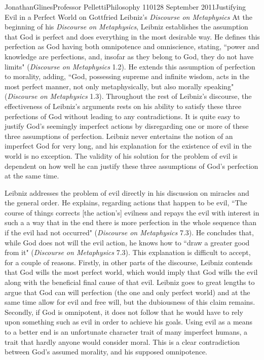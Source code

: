 \documentclass[12pt,letterpaper]{article}
\begin{document}
\begin{mla}{Jonathan}{Glines}{Professor Pelletti}{Philosophy 1101}{28 September 2011}{Justifying Evil in a Perfect World on Gottfried Leibniz's \textit{Discourse on Metaphysics}}
At the beginning of his \textit{Discourse on Metaphysics}, Leibniz establishes the assumption that God is perfect and does everything in the most desirable way. He defines this perfection as God having both omnipotence and omniscience, stating, ``power and knowledge are perfections, and, insofar as they belong to God, they do not have limits" (\textit{Discourse on Metaphysics} 1.2). He extends this assumption of perfection to morality, adding, ``God, possessing supreme and infinite wisdom, acts in the most perfect manner, not only metaphysically, but also morally speaking" (\textit{Discourse on Metaphysics} 1.3). Throughout the rest of Leibniz's discourse, the effectiveness of Leibniz's arguments rests on his ability to satisfy these three perfections of God without leading to any contradictions. It is quite easy to justify God's seemingly imperfect actions by disregarding one or more of these three assumptions of perfection. Leibniz never entertains the notion of an imperfect God for very long, and his explanation for the existence of evil in the world is no exception. The validity of his solution for the problem of evil is dependent on how well he can justify these three assumptions of God's perfection at the same time.

Leibniz addresses the problem of evil directly in his discussion on miracles and the general order. He explains, regarding actions that happen to be evil, ``The course of things corrects [the action's] evilness and repays the evil with interest in such a a way that in the end there is more perfection in the whole sequence than if the evil had not occurred" (\textit{Discourse on Metaphysics} 7.3). He concludes that, while God does not will the evil action, he knows how to ``draw a greater good from it" (\textit{Discourse on Metaphysics} 7.3). This explanation is difficult to accept, for a couple of reasons. Firstly, in other parts of the discourse, Leibniz contends that God wills the most perfect world, which would imply that God wills the evil along with the beneficial final cause of that evil. Leibniz goes to great lengths to argue that God can will perfection (the one and only perfect world) and at the same time allow for evil and free will, but the dubiousness of this claim remains. Secondly, if God is omnipotent, it does not follow that he would have to rely upon something such as evil in order to achieve his goals. Using evil as a means to a better end is an unfortunate character trait of many imperfect humans, a trait that hardly anyone would consider moral. This is a clear contradiction between God's assumed morality, and his supposed omnipotence.


\end{mla}
\end{document}
